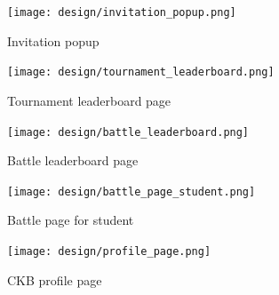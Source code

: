 \begin{figure} [H]
    \begin{center}
        \texttt{[image: design/invitation\_popup.png]}
        \caption{Invitation popup}
        \label{fig: invitation_popup}
    \end{center}
\end{figure}

\begin{figure} [H]
    \begin{center}
        \texttt{[image: design/tournament\_leaderboard.png]}
        \caption{Tournament leaderboard page}
        \label{fig: tournament_leaderboard}
    \end{center}
\end{figure}

\begin{figure} [H]
    \begin{center}
        \texttt{[image: design/battle\_leaderboard.png]}
        \caption{Battle leaderboard page}
        \label{fig: battle_leaderboard}
    \end{center}
\end{figure}

\begin{figure} [H]
    \begin{center}
        \texttt{[image: design/battle\_page\_student.png]}
        \caption{Battle page for student}
        \label{fig: battle_page_student}
    \end{center}
\end{figure}


\begin{figure} [H]
    \begin{center}
        \texttt{[image: design/profile\_page.png]}
        \caption{CKB profile page}
        \label{fig: prof_page}
    \end{center}
\end{figure}